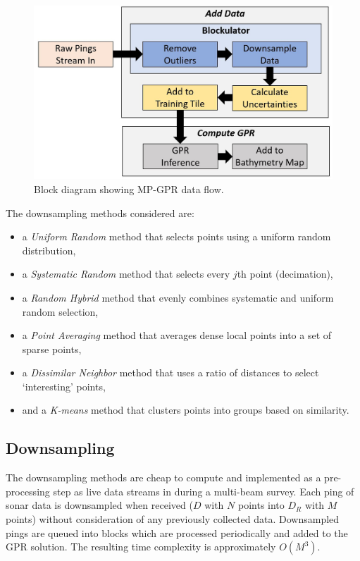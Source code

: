 \begin{figure}[!ht]
    \begin{center}
       \includegraphics[width=.75\textwidth]{images/system_overview_MPGPR.jpg}
    \end{center}
    \caption{Block diagram showing MP-GPR data flow.}
    \label{fig:system_block_diagram}
\end{figure}

The downsampling methods considered are:
\begin{itemize} [noitemsep]
    \item a \textit{Uniform Random} method that selects points using a uniform random distribution,
    \item a \textit{Systematic Random} method that selects every $j$th point (decimation),
    \item a \textit{Random Hybrid} method that evenly combines systematic and uniform random selection,
    \item a \textit{Point Averaging} method that averages dense local points into a set of sparse points,
    \item a \textit{Dissimilar Neighbor} method that uses a ratio of distances to select `interesting' points,
    \item and a \textit{K-means} method that clusters points into groups based on similarity.
\end{itemize}

\subsection{Downsampling}\label{sec:downsampling}

The downsampling methods are cheap to compute and implemented as a pre-processing step as live data streams in during a multi-beam survey. Each ping of sonar data is downsampled when received ($D$ with $N$ points into $D_R$ with $M$ points) without consideration of any previously collected data. Downsampled pings are queued into blocks which are processed periodically and added to the GPR solution. The resulting time complexity is approximately $O(M^3)$.

